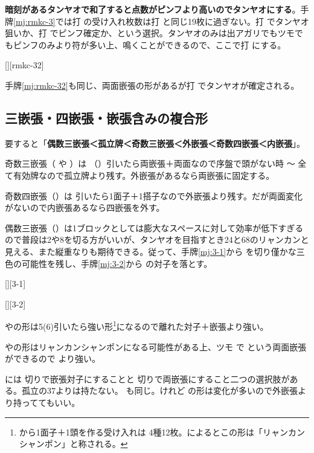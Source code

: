 \documentclass[10pt, twocolumn]{article}
\newlength\stdbls %
\newcommand{\mjfn}[1]{\raisebox{-.135\stdbls}{\mahjong[0.75\stdbls]{#1}}}
\begin{document}
\textbf{暗刻があるタンヤオで和了すると点数がピンフより高いのでタンヤオにする}\citep[][p. 119]{uzaku-haikouritsu}。手牌\ref{mj:rmkc-3}では打  の受け入れ枚数は打  と同じ19枚に過ぎない。打  でタンヤオ狙いか、打  でピンフ確定か、という選択。タンヤオのみは出アガリでもツモでもピンフのみより符が多い上、鳴くことができるので、ここで打  にする。

[][rmkc-32]

手牌\ref{mj:rmkc-32}も同じ、両面嵌張の形があるが打  でタンヤオが確定される\citep[][p. 10]{uzaku-nankiru}。

\subsection{三嵌張・四嵌張・嵌張含みの複合形}

要すると「\textbf{偶数三嵌張＜孤立牌＜奇数三嵌張＜外嵌張＜奇数四嵌張＜内嵌張}」\citep{chirno-kanchan}。

奇数三嵌張（ や ）は （）引いたら両嵌張＋両面なので序盤で頭がない時 〜 全て有効牌なので孤立牌より残す。外嵌張があるなら両嵌張に固定する。

奇数四嵌張（）は  引いたら1面子＋1搭子なので外嵌張より残す。だが両面変化がないので内嵌張あるなら四嵌張を外す。

偶数三嵌張（）は1ブロックとしては膨大なスペースに対して効率が低下すぎるので普段は2や8を切る方がいいが、タンヤオを目指すとき24と68のリャンカンと見える、また縦重なりも期待できる。従って、手牌\ref{mj:3-1}から  を切り僅かな三色の可能性を残し、手牌\ref{mj:3-2}から  の対子を落とす\citep{yuusee-2468}。

[][3-1]

[][3-2]

 やの形は5(6)引いたら強い形\footnote{\mjfn{11355m} から1面子＋1頭を作る受け入れは \mjfn{1245m} 4種12枚。\citet{yuusee-11355}によるとこの形は「リャンカンシャンポン」と称される。}になるので離れた対子＋嵌張より強い。

 やの形はリャンカンシャンポンになる可能性がある上、ツモ  で  という両面嵌張ができるので  より強い。

 には  切りで嵌張対子にすることと  切りで両嵌張にすること二つの選択肢がある。孤立の37よりは持たない。 も同じ。けれど  の形は変化が多いので外嵌張より持っててもいい。
\end{document}

